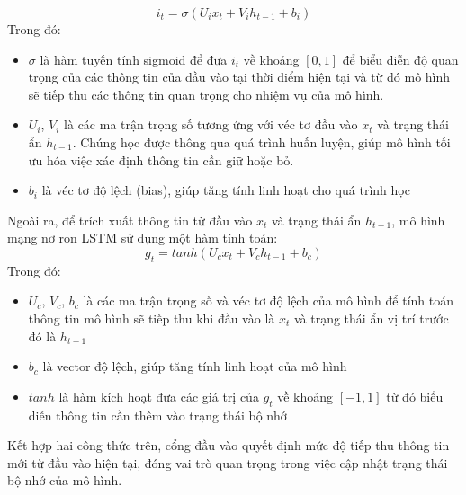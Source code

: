 \begin{equation}
    i_{t}=\sigma(U_{i}x_{t}+V_{i}h_{t-1}+b_{i})
\end{equation} 
Trong đó:
\begin{itemize}
    \item $\sigma$ là hàm tuyến tính sigmoid để đưa $i_{t}$ về khoảng $[0, 1]$ để biểu diễn độ quan trọng của các thông tin của đầu vào tại thời điểm hiện tại và từ đó mô hình sẽ tiếp thu các thông tin quan trọng cho nhiệm vụ của mô hình.
    \item $U_{i}$, $V_{i}$ là các ma trận trọng số tương ứng với véc tơ đầu vào $x_t$ và trạng thái ẩn $h_{t-1}$. Chúng học được thông qua quá trình huấn luyện, giúp mô hình tối ưu hóa việc xác định thông tin cần giữ hoặc bỏ.
    \item $b_i$ là véc tơ độ lệch (bias), giúp tăng tính linh hoạt cho quá trình học
\end{itemize}

Ngoài ra, để trích xuất thông tin từ đầu vào $x_t$ và trạng thái ẩn $h_{t-1}$, mô hình mạng nơ ron LSTM sử dụng một hàm tính toán:
\begin{equation}
    g_{t}=tanh(U_{c}x_{t}+V_{c}h_{t-1}+b_{c})
\end{equation}
Trong đó:
\begin{itemize}
    \item $U_{c}$, $V_{c}$, $b_{c}$ là các ma trận trọng số và véc tơ độ lệch của mô hình để tính toán thông tin mô hình sẽ tiếp thu khi đầu vào là $x_{t}$ và trạng thái ẩn vị trí trước đó là $h_{t-1}$
    \item $b_c$ là vector độ lệch, giúp tăng tính linh hoạt của mô hình
    \item $tanh$ là hàm kích hoạt đưa các giá trị của $g_t$ về khoảng $[-1,1]$ từ đó biểu diễn thông tin cần thêm vào trạng thái bộ nhớ
\end{itemize}
Kết hợp hai công thức trên, cổng đầu vào quyết định mức độ tiếp thu thông tin mới từ đầu vào hiện tại, đóng vai trò quan trọng trong việc cập nhật trạng thái bộ nhớ của mô hình.


